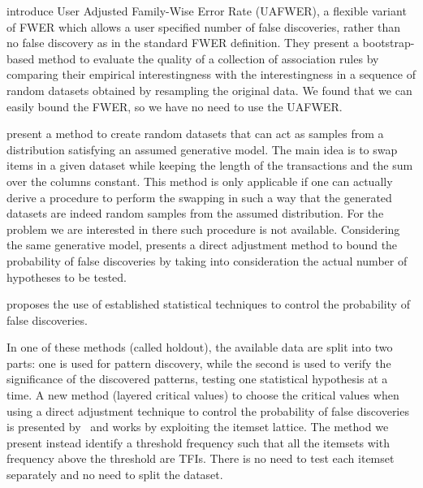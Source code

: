 \citet{LallichTP06} introduce User Adjusted
Family-Wise Error Rate (UAFWER), a flexible variant of FWER which allows a user
specified number of false discoveries, rather than no false discovery as in the
standard FWER definition. They present a bootstrap-based method to evaluate the
quality of a collection of association rules by comparing their empirical
interestingness with the interestingness in a sequence of random datasets
obtained by resampling the original data. We found that we can easily bound the
FWER, so we have no need to use the UAFWER.
\fi

\citet{GionisMMT07} present a method to create random datasets that can act as
samples from a distribution satisfying an assumed generative model. The main
idea is to swap items in a given dataset while keeping the length of the
transactions and the sum over the columns constant. This method is only
applicable if one can actually derive a procedure to perform the swapping in
such a way that the generated datasets are indeed random samples from the assumed
distribution. For the problem we are interested in there such 
procedure is not available. Considering the same generative model,
\citet{Hanhijarvi11} presents a direct adjustment method to bound the
probability of false discoveries by %
taking into consideration the actual number of hypotheses to be tested.

\citet{Webb07} proposes the use of established statistical techniques to
control the probability of false discoveries. 
\iffalse
One method is based on the Bonferroni and
Holm correction, where the significance level is decreased proportionally to the
number of tested hypotheses and each of them is tested separately. 
\fi
In one of these methods (called holdout), the available data are split into two parts: one is
used for pattern discovery, while the second is used to verify the significance
of the discovered patterns, testing one statistical hypothesis at a time. A new
method (layered critical values) to choose the critical values when using a
direct adjustment technique to control the probability of false discoveries %
is presented by~\citet{Webb08} and works by exploiting the itemset lattice.
The method we present instead identify a threshold frequency such that all the
itemsets with frequency above the threshold are TFIs. There is no need to test
each itemset separately and no need to split the dataset. 
\iffalse
In our
experimental evaluation we compared the statistical power of the test we propose
with the power of the holdout method, showing that neither is uniformly better
than the other. We tried to apply the method based on the Bonferroni/Holm
correction, and the layered critical value approach, but the very high number of
itemsets to take into consideration makes these methods very inefficient in
practice, to the point of hitting the precision limit of the computing platform.
\fi

